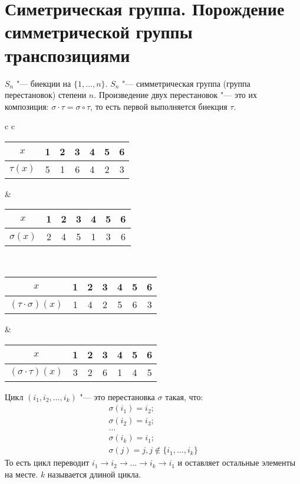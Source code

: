 \section{Симетрическая группа. Порождение симметрической группы транспозициями}

\begin{Def}
$S_n$ "--- биекции на $\{1, \dotsc, n\}$.
$S_n$ "--- симметрическая группа (группа перестановок) степени $n$.
Произведение двух перестановок "--- это их композиция: $\sigma \cdot \tau = \sigma \circ \tau$,
то есть первой выполняется биекция $\tau$.
\end{Def}

\begin{exmp}

\begin{tabular}{ c c }
  \begin{tabular}{|c|c|c|c|c|c|c|}
  \hline
  $x$       & 1 & 2 & 3 & 4 & 5 & 6 \\ \hline
  $\tau(x)$ & 5 & 1 & 6 & 4 & 2 & 3 \\ \hline
  \end{tabular}
  &
  \begin{tabular}{|c|c|c|c|c|c|c|}
  \hline
  $x$       & 1 & 2 & 3 & 4 & 5 & 6 \\ \hline
  $\sigma(x)$ & 2 & 4 & 5 & 1 & 3 & 6 \\ \hline
  \end{tabular}
  \\
  \rule{0pt}{4ex}
  \begin{tabular}{|c|c|c|c|c|c|c|}
  \hline
  $x$                    & 1 & 2 & 3 & 4 & 5 & 6 \\ \hline
  $(\tau\cdot\sigma)(x)$ & 1 & 4 & 2 & 5 & 6 & 3 \\ \hline
  \end{tabular}
  &
  \begin{tabular}{|c|c|c|c|c|c|c|}
  \hline
  $x$                    & 1 & 2 & 3 & 4 & 5 & 6 \\ \hline
  $(\sigma\cdot\tau)(x)$ & 3 & 2 & 6 & 1 & 4 & 5 \\ \hline
  \end{tabular}
\end{tabular}
\end{exmp}

\begin{Def}
	Цикл $(i_1, i_2, \dotsc, i_k)$ "--- это перестановка $\sigma$ такая, что:
	\begin{gather*}
	\sigma(i_1) = i_2; \\ 
	\sigma(i_2) = i_3; \\
	\dotsc \\
	\sigma(i_k) = i_1; \\
	\sigma(j) = j, j \notin \{i_1, \dotsc, i_k\}
	\end{gather*}
	То есть цикл переводит $i_1\to i_2 \to \dotsc \to i_k \to i_1$ и оставляет остальные элементы на месте.
	$k$ называется длиной цикла.
\end{Def}

